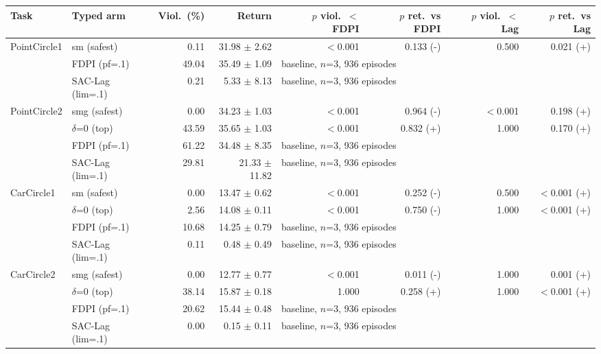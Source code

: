 \begin{tabular}{llrrrrrr}
\toprule
Task & Typed arm & Viol.\ (\%) & Return & $p$ viol.\ $<$ FDPI & $p$ ret.\ vs FDPI & $p$ viol.\ $<$ Lag & $p$ ret.\ vs Lag \\
\midrule
PointCircle1 & sm (safest) & 0.11 & 31.98 $\pm$ 2.62 & $<$0.001 & 0.133 (-) & 0.500 & 0.021 (+) \\
 & FDPI (pf=.1) & 49.04 & 35.49 $\pm$ 1.09 & \multicolumn{4}{l}{baseline, $n$=3, 936 episodes} \\
 & SAC-Lag (lim=.1) & 0.21 & 5.33 $\pm$ 8.13 & \multicolumn{4}{l}{baseline, $n$=3, 936 episodes} \\
\midrule
PointCircle2 & smg (safest) & 0.00 & 34.23 $\pm$ 1.03 & $<$0.001 & 0.964 (-) & $<$0.001 & 0.198 (+) \\
 & $\delta$=0 (top) & 43.59 & 35.65 $\pm$ 1.03 & $<$0.001 & 0.832 (+) & 1.000 & 0.170 (+) \\
 & FDPI (pf=.1) & 61.22 & 34.48 $\pm$ 8.35 & \multicolumn{4}{l}{baseline, $n$=3, 936 episodes} \\
 & SAC-Lag (lim=.1) & 29.81 & 21.33 $\pm$ 11.82 & \multicolumn{4}{l}{baseline, $n$=3, 936 episodes} \\
\midrule
CarCircle1 & sm (safest) & 0.00 & 13.47 $\pm$ 0.62 & $<$0.001 & 0.252 (-) & 0.500 & $<$0.001 (+) \\
 & $\delta$=0 (top) & 2.56 & 14.08 $\pm$ 0.11 & $<$0.001 & 0.750 (-) & 1.000 & $<$0.001 (+) \\
 & FDPI (pf=.1) & 10.68 & 14.25 $\pm$ 0.79 & \multicolumn{4}{l}{baseline, $n$=3, 936 episodes} \\
 & SAC-Lag (lim=.1) & 0.11 & 0.48 $\pm$ 0.49 & \multicolumn{4}{l}{baseline, $n$=3, 936 episodes} \\
\midrule
CarCircle2 & smg (safest) & 0.00 & 12.77 $\pm$ 0.77 & $<$0.001 & 0.011 (-) & 1.000 & 0.001 (+) \\
 & $\delta$=0 (top) & 38.14 & 15.87 $\pm$ 0.18 & 1.000 & 0.258 (+) & 1.000 & $<$0.001 (+) \\
 & FDPI (pf=.1) & 20.62 & 15.44 $\pm$ 0.48 & \multicolumn{4}{l}{baseline, $n$=3, 936 episodes} \\
 & SAC-Lag (lim=.1) & 0.00 & 0.15 $\pm$ 0.11 & \multicolumn{4}{l}{baseline, $n$=3, 936 episodes} \\
\bottomrule
\end{tabular}
